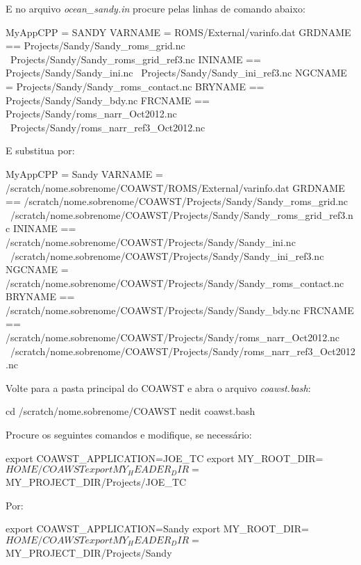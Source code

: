 \noindent E no arquivo \textit{ocean\_sandy.in} procure pelas linhas de comando abaixo:
\bigskip

\begin{bashcode}
MyAppCPP = SANDY
VARNAME  = ROMS/External/varinfo.dat
GRDNAME == Projects/Sandy/Sandy_roms_grid.nc \
           Projects/Sandy/Sandy_roms_grid_ref3.nc
ININAME == Projects/Sandy/Sandy_ini.nc \
           Projects/Sandy/Sandy_ini_ref3.nc
NGCNAME =  Projects/Sandy/Sandy_roms_contact.nc
BRYNAME == Projects/Sandy/Sandy_bdy.nc
FRCNAME == Projects/Sandy/roms_narr_Oct2012.nc \
           Projects/Sandy/roms_narr_ref3_Oct2012.nc
\end{bashcode}
\bigskip

\noindent E substitua por:
\bigskip

\begin{bashcode}[fontsize=\footnotesize]
MyAppCPP = Sandy
VARNAME  = /scratch/nome.sobrenome/COAWST/ROMS/External/varinfo.dat
GRDNAME == /scratch/nome.sobrenome/COAWST/Projects/Sandy/Sandy_roms_grid.nc \
           /scratch/nome.sobrenome/COAWST/Projects/Sandy/Sandy_roms_grid_ref3.nc
ININAME == /scratch/nome.sobrenome/COAWST/Projects/Sandy/Sandy_ini.nc \
           /scratch/nome.sobrenome/COAWST/Projects/Sandy/Sandy_ini_ref3.nc
NGCNAME =  /scratch/nome.sobrenome/COAWST/Projects/Sandy/Sandy_roms_contact.nc
BRYNAME == /scratch/nome.sobrenome/COAWST/Projects/Sandy/Sandy_bdy.nc
FRCNAME == /scratch/nome.sobrenome/COAWST/Projects/Sandy/roms_narr_Oct2012.nc \
           /scratch/nome.sobrenome/COAWST/Projects/Sandy/roms_narr_ref3_Oct2012.nc
\end{bashcode}
\bigskip

\noindent Volte para a pasta principal do COAWST e abra o arquivo \textit{coawst.bash}:
\bigskip

\begin{bashcode}
cd /scratch/nome.sobrenome/COAWST
nedit coawst.bash
\end{bashcode}
\bigskip

\noindent Procure os seguintes comandos e modifique, se necessário:
\bigskip

\begin{bashcode}
export   COAWST_APPLICATION=JOE_TC
export   MY_ROOT_DIR=${HOME}/COAWST
export   MY_HEADER_DIR=${MY_PROJECT_DIR}/Projects/JOE_TC
\end{bashcode}
\bigskip

\noindent Por:
\bigskip

\begin{bashcode}
export   COAWST_APPLICATION=Sandy
export   MY_ROOT_DIR=${HOME}/COAWST
export   MY_HEADER_DIR=${MY_PROJECT_DIR}/Projects/Sandy
\end{bashcode}
\bigskip

